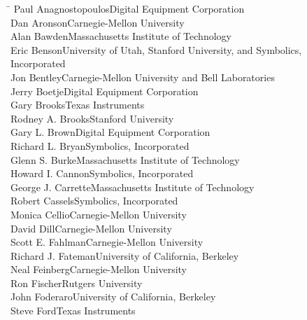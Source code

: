 \begin{tabbing}
\hskip8.5pc\=\kill
Paul Anagnostopoulos\>Digital Equipment Corporation \\
Dan Aronson\>Carnegie-Mellon University \\
Alan Bawden\>Massachusetts Institute of Technology \\
Eric Benson\>University of Utah, Stanford University, and Symbolics,\\
           \>Incorporated \\
Jon Bentley\>Carnegie-Mellon University and Bell
Laboratories \\ Jerry Boetje\>Digital Equipment Corporation \\
Gary Brooks\>Texas Instruments \\
Rodney A. Brooks\>Stanford University \\
Gary L. Brown\>Digital Equipment Corporation \\
Richard L. Bryan\>Symbolics, Incorporated \\
Glenn S. Burke\>Massachusetts Institute of Technology \\
Howard I. Cannon\>Symbolics, Incorporated \\
George J. Carrette\>Massachusetts Institute of Technology \\
Robert Cassels\>Symbolics, Incorporated \\
Monica Cellio\>Carnegie-Mellon University \\
David Dill\>Carnegie-Mellon University \\
Scott E. Fahlman\>Carnegie-Mellon University \\
Richard J. Fateman\>University of California, Berkeley \\
Neal Feinberg\>Carnegie-Mellon University \\
Ron Fischer\>Rutgers University \\
John Foderaro\>University of California, Berkeley \\
Steve Ford\>Texas Instruments
\end{tabbing}


